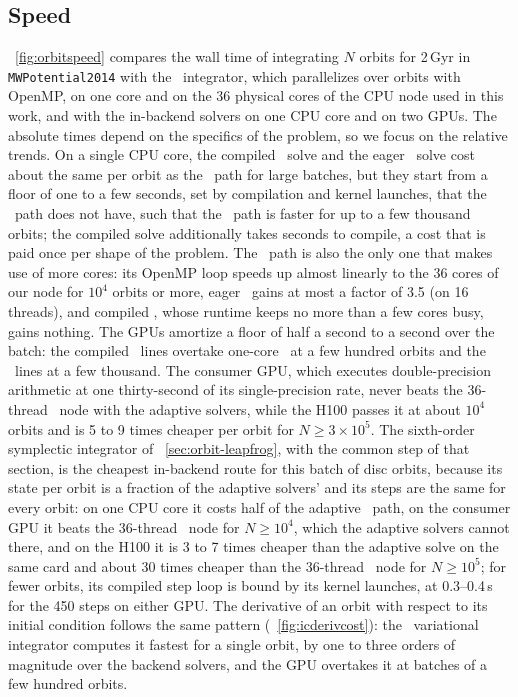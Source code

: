 \subsection{Speed}\label{sec:orbit-speed}

\figurename~\ref{fig:orbitspeed} compares the wall time of integrating
$N$ orbits for 2\,Gyr in \texttt{MWPotential2014} with the \cc\ integrator,
which parallelizes over orbits with OpenMP, on one core and on the 36
physical cores of the CPU node used in this work, and with the in-backend solvers on one CPU
core and on two GPUs. The absolute times depend on the specifics of the
problem, so we focus on the relative trends. On a single CPU core, the compiled \jax\
solve and the eager \torch\ solve cost about the same per orbit as the
\cc\ path for large batches, but they start from a floor of one to a
few seconds, set by compilation and kernel launches, that the \cc\ path
does not have, such that the \cc\ path is faster for up to a few
thousand orbits; the compiled solve additionally takes seconds to
compile, a cost that is paid once per shape of the problem. The \cc\
path is also the only one that makes use of more cores: its OpenMP loop
speeds up almost linearly to the 36 cores of our node for $10^4$ orbits
or more, eager \torch\ gains at most a factor of 3.5 (on 16 threads),
and compiled \jax, whose runtime keeps no more than a few cores busy,
gains nothing. The GPUs amortize a floor of half a second to a second
over the batch: the compiled \jax\ lines overtake one-core \cc\ at a
few hundred orbits and the \torch\ lines at a few thousand. The
consumer GPU, which executes double-precision arithmetic at one
thirty-second of its single-precision rate, never beats the 36-thread
\cc\ node with the adaptive solvers, while the H100 passes it at about
$10^4$ orbits and is 5 to 9 times cheaper per orbit for
$N\geq3\times10^5$. The
sixth-order symplectic integrator of
\sectionname~\ref{sec:orbit-leapfrog}, with the common step of that
section, is the cheapest in-backend route for this batch of disc
orbits, because its state per orbit is a fraction of the adaptive
solvers' and its steps are the same for every orbit: on one CPU core
it costs half of the adaptive \cc\ path, on the consumer GPU it beats
the 36-thread \cc\ node for $N\geq10^4$, which the adaptive solvers
cannot there, and on the H100 it is 3 to 7 times cheaper than the
adaptive solve on the same card and about 30 times cheaper than the
36-thread \cc\ node for $N\geq10^5$; for fewer
orbits, its compiled step loop is bound by its kernel launches, at
0.3--0.4\,s for the 450 steps on either GPU. The derivative of an orbit with respect to its
initial condition follows the same pattern
(\figurename~\ref{fig:icderivcost}): the \cc\ variational integrator
computes it fastest for a single orbit, by one to three orders of
magnitude over the backend solvers, and the GPU overtakes it at
batches of a few hundred orbits.

